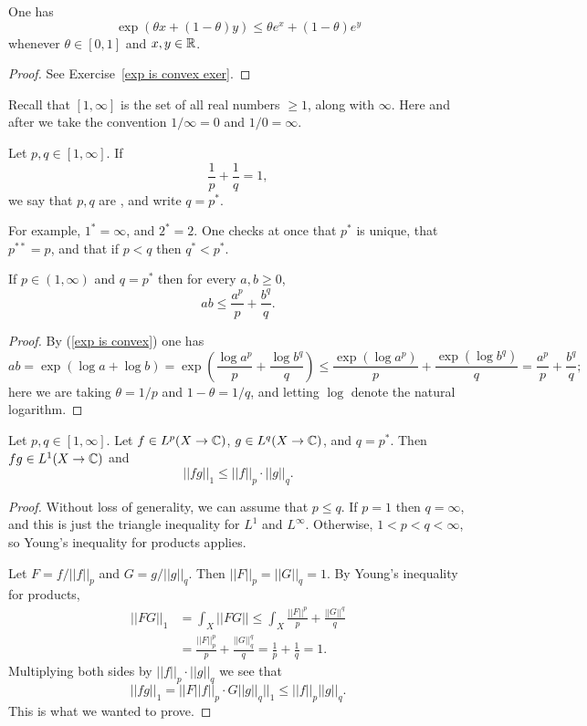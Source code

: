 \begin{lemma}
One has
\begin{equation}
\label{exp is convex}
\exp(\theta x + (1 - \theta)y) \leq \theta e^{x} + (1 - \theta)e^y
\end{equation}
whenever $\theta \in [0, 1]$ and $x, y \in \mathbb{R}$.
\end{lemma}
\begin{proof}
See Exercise~\ref{exp is convex exer}.
\end{proof}

Recall that $[1, \infty]$ is the set of all real numbers $\geq 1$, along with $\infty$.
Here and after we take the convention $1/\infty = 0$ and $1/0 = \infty$.

\begin{definition}
Let $p, q \in [1, \infty]$. If
\[\frac{1}{p} + \frac{1}{q} = 1,\]
we say that $p, q$ are , and write $q = p^*$.
\end{definition}

For example, $1^* = \infty$, and $2^* = 2$. One checks at once that $p^*$ is unique, that $p^{**} = p$, and that if $p < q$ then $q^* < p^*$.

\begin{theorem}
If $p \in (1, \infty)$ and $q = p^*$ then for every $a,b \geq 0$,
\[ab \leq \frac{a^p}{p} + \frac{b^q}{q}.\]
\end{theorem}
\begin{proof}
By (\ref{exp is convex}) one has
\[ab = \exp(\log a + \log b) = \exp\left(\frac{\log a^p}{p} + \frac{\log b^q}{q}\right) \leq \frac{\exp(\log a^p)}{p} + \frac{\exp(\log b^q)}{q} = \frac{a^p}{p} + \frac{b^q}{q};\]
here we are taking $\theta = 1/p$ and $1 - \theta = 1/q$, and letting $\log$ denote the natural logarithm.
\end{proof}

\begin{theorem}
Let $p, q \in [1, \infty]$.
Let $f \in L^p(X \to \mathbb{C})$, $g \in L^q(X \to \mathbb{C})$, and $q = p^*$.
Then $fg \in L^1(X \to \mathbb{C})$ and
\begin{equation}
\label{Holder inequality}
||fg||_1 \leq ||f||_{p}  \cdot ||g||_q.
\end{equation}
\end{theorem}
\begin{proof}
Without loss of generality, we can assume that $p \leq q$.
If $p = 1$ then $q = \infty$, and this is just the triangle inequality for $L^1$ and $L^\infty$.
Otherwise, $1 < p < q < \infty$, so Young's inequality for products applies.

Let $F = f/||f||_{p} $ and $G = g/||g||_q$. Then $||F||_{p}  = ||G||_{q} = 1$.
By Young's inequality for products,
\begin{align*}||FG||_1 &= \int_{X} ||FG|| \leq \int_{X} \frac{||F||^p}{p} + \frac{||G||^q}{q}\\
&= \frac{||F||_{p} ^p}{p} + \frac{||G||_q^q}{q} = \frac{1}{p} + \frac{1}{q}  = 1.
\end{align*}
Multiplying both sides by $||f||_{p}  \cdot ||g||_q$ we see that
\[||fg||_1 = ||F||f||_{p}  \cdot G||g||_q||_1 \leq ||f||_{p}  ||g||_q.\]
This is what we wanted to prove.
\end{proof}

